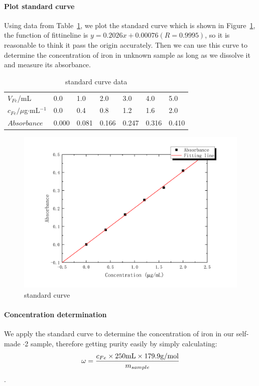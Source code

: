 \paragraph{Plot standard curve}
Using data from Table~\ref{tab.Cal}, we plot the standard curve which is shown in Figure~\ref{fig1}, the function of fittineline is $y=0.2026x+0.00076(R=0.9995)$, so it is reasonable to think it pass the origin accurately. Then we can use this curve to determine the concentration of iron in unknown sample as long as we dissolve it and measure its absorbance.
\begin{table}[H]
	\caption{standard curve data}
	\label{tab.Cal}
	\begin{tabular}{lllllll}
	\toprule
	$V_{Fe}$/mL    & 0.0 & 1.0 & 2.0 & 3.0 & 4.0 & 5.0 \\
	$c_{Fe}/\mu$g$\cdot$mL$^{-1}$
				   & 0.0 & 0.4 & 0.8 & 1.2 & 1.6 & 2.0 \\
	\midrule
	$Absorbance$     &0.000&0.081&0.166&0.247&0.316&0.410\\
	\bottomrule
	\end{tabular}
\end{table}

\begin{figure}[H]
	\includegraphics[width=\linewidth]{Fig1.pdf}
	\caption{standard curve}
	\label{fig1}
\end{figure}

\paragraph{Concentration determination}
We apply the standard curve to determine the concentration of iron in our self-made $\cdot$2 sample, therefore getting purity easily by simply calculating: \[\omega=\frac{c_{Fe}\times250{\rm mL}\times179.9{\rm g/mol}}{m_{sample}}\].


